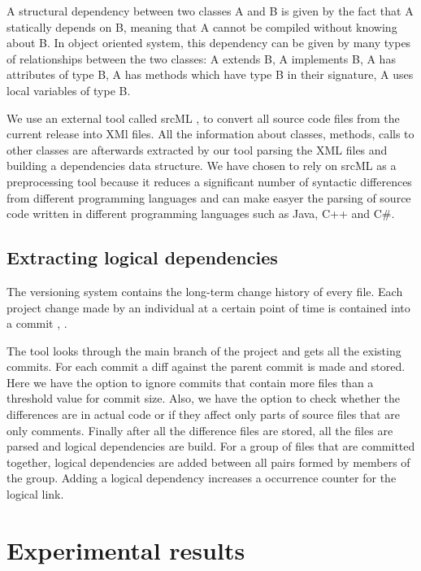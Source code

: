 \documentclass[conference]{IEEEtran}
\begin{document}
A structural dependency between two classes A and B is given by the fact that A statically depends on B, meaning that A cannot be compiled without knowing about B. In object oriented system, this dependency can be given by many types of relationships between the two classes: A extends B, A implements B, A has attributes of type B, A has methods which have type B in their signature, A uses local variables of type B.


 We use an external tool called srcML \cite{2003:XLC:851042.857028}, \cite{Collard:2011:LTF:2067850.2068011} to convert all source code files from the current release into XMl files. All the information about classes, methods, calls to other classes are afterwards extracted by our tool parsing the XML files and building a dependencies data structure. We have chosen to rely on srcML as a preprocessing tool because it reduces a significant number of syntactic differences from different programming languages and can make easyer the parsing of source code written in different programming languages such as Java, C++ and C\#.    

\subsection{Extracting logical dependencies}

The versioning system contains the long-term change history of every file. Each project change made by an individual at a certain point of time is contained into a commit \cite{svn}, \cite{DBLP:journals/jss/AjienkaC17}. 

The tool looks through the main branch of the project and gets all the existing commits. For each commit a diff against the parent commit is made and stored. Here we have the option to ignore commits that contain more files than a threshold value for commit size. Also, we have the option to check whether the differences are in actual code or if they affect only parts of source files that are only comments.  Finally after all the difference files are stored, all the files are parsed and logical dependencies are build. For a group of files that are committed together, logical dependencies are added between all pairs formed by members of the group. Adding a logical dependency increases a occurrence counter for the logical link. 

\section{Experimental results}
\label{sec:experiments}
\end{document}
